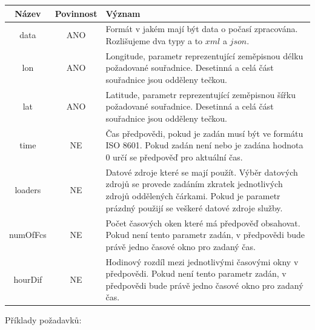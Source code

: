 \documentclass[czech,bachelor,dept460,male,csharp,cpdeclaration]{diploma}
\begin{document}
	\begin{center}
		
		
		\begin{tabular}{c c p{13cm}}
			Název & Povinnost & Význam \\
			\midrule
			data & ANO & Formát v jakém mají být data o počasí zpracována. Rozlišujeme dva typy a to $xml$ a $json$.\\
			lon & ANO & Longitude, parametr reprezentující zeměpisnou délku požadované souřadnice. Desetinná a celá část souřadnice jsou odděleny tečkou.\\
			lat & ANO & Latitude, parametr reprezentující zeměpisnou šířku požadované souřadnice. Desetinná a celá část souřadnice jsou odděleny tečkou.\\
			time & NE & Čas předpovědi, pokud je zadán musí být ve formátu ISO 8601. Pokud zadán není nebo je zadána hodnota 0  určí se předpověď pro aktuální čas.\\ 
			loaders & NE & Datové zdroje které se mají použít. Výběr datových zdrojů se provede zadáním zkratek jednotlivých zdrojů oddělených čárkami. Pokud je parametr prázdný použijí se veškeré datové zdroje služby. \\
			numOfFcs & NE & Počet časových oken které má předpověď obsahovat. Pokud není tento parametr zadán, v předpovědi bude právě jedno časové okno pro zadaný čas.\\
			hourDif & NE & Hodinový rozdíl mezi jednotlivými časovými okny v předpovědi. Pokud není tento parametr zadán, v předpovědi bude právě jedno časové okno pro zadaný čas.\\
		\end{tabular}
	\end{center}
	\newpage
	Příklady požadavků:
\end{document}
